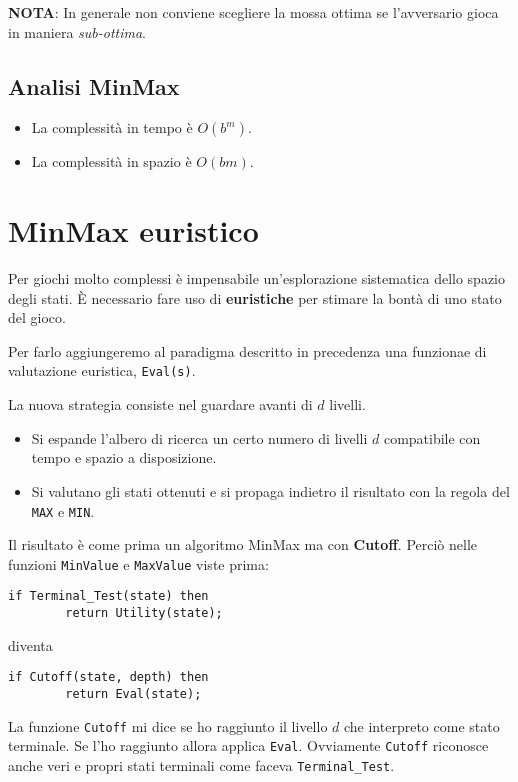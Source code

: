 \textbf{NOTA}: In generale non conviene scegliere la mossa ottima se l'avversario gioca in maniera \emph{sub-ottima}.

\subsection{Analisi MinMax}
\begin{itemize}
	\item La complessit\`a in tempo \`e $O(b^m)$.
	\item La complessit\`a in spazio \`e $O(bm)$.
\end{itemize}

\section{MinMax euristico}
Per giochi molto complessi \`e impensabile un'esplorazione sistematica dello spazio degli stati. \`E necessario fare
uso di \textbf{euristiche} per stimare la bont\`a di uno stato del gioco.

Per farlo aggiungeremo al paradigma descritto in precedenza una funzionae di valutazione euristica, \verb|Eval(s)|.

La nuova strategia consiste nel guardare avanti di $d$ livelli.
\begin{itemize}
	\item Si espande l'albero di ricerca un certo numero di livelli $d$ compatibile con tempo e spazio a disposizione.
	\item Si valutano gli stati ottenuti e si propaga indietro il risultato con la regola del \verb|MAX| e \verb|MIN|.
\end{itemize}
Il risultato \`e come prima un algoritmo MinMax ma con \textbf{Cutoff}. Perci\`o nelle funzioni \verb|MinValue| e
\verb|MaxValue| viste prima:
\begin{lstlisting}[style=pseudo-style]
	if Terminal_Test(state) then
		return Utility(state);
\end{lstlisting}
diventa
\begin{lstlisting}[style=pseudo-style]
	if Cutoff(state, depth) then
		return Eval(state);
\end{lstlisting}
La funzione \verb|Cutoff| mi dice se ho raggiunto il livello $d$ che interpreto come stato terminale. Se l'ho raggiunto
allora applica \verb|Eval|. Ovviamente \verb|Cutoff| riconosce anche veri e propri stati terminali come faceva
\verb|Terminal_Test|.

